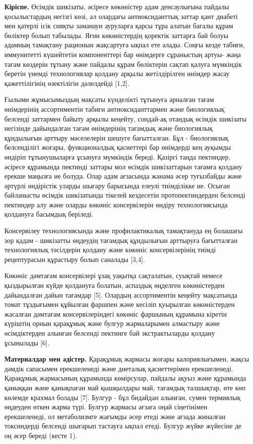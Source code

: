 \begin{multicols}{2}
{\bfseries Кіріспе.} Өсімдік шикізаты, әсіресе көкөністер адам денсаулығына
пайдалы қосылыстардың негізгі көзі, ал олардағы антиоксиданттық заттар
қант диабеті мен қатерлі ісік сияқты заманауи ауруларға қарсы тұра
алатын бағалы құрам бөліктер болып табылады. Яғни көкөністердің қоректік
заттарға бай болуы адамның тамақтану рационын жақсартуға ықпал ете
алады. Соңғы кезде табиғи, иммунитетті күшейтетін компоненттері бар
өнімдерге сұраныстың артуы- жаңа тағам көздерін тұтыну және пайдалы
құрам бөліктерін сақтап қалуға мүмкіндік беретін үнемді технологиялар
қолдану арқылы жетілдірілген өнімдер жасау қажеттілігінің өзектілігін
дәлелдейді {[}1,2{]}.

Ғылыми жұмысымыздың мақсаты күнделікті тұтынуға арналған тағам
өнімдерінің ассортиментін табиғи антиоксиданттармен және биологиялық
белсенді заттармен байыту арқылы кеңейту, сондай-ақ отандық өсімдік
шикізаты негізінде дайындалған тағам өнімдерінің тағамдық және
биологиялық құндылығын арттыру мәселелерін шешуге бағытталған. Бұл -
биологиялық белсенділігі жоғары, функционалдық қасиеттері бар өнімдерді
кең ауқымды өндіріп тұтынушыларға ұсынуға мүмкіндік береді. Қазіргі
таңда пектиндер, әсіресе құрамында пектинді заттары мол өсімдік
шикізаттарын тағамға қолдану ерекше маңызға ие болуда. Олар адам
ағзасында жанама әсер туғызбайды және әртүрлі өндірістік уларды шығару
барысында елеулі тиімділікке ие. Осыған байланысты өсімдік шикізатында
тікелей кездесетін протопектиндерден белсенді пектиндер алу және оларды
көкөніс консервілерін өндіру технологиясында қолдануға басымдық
беріледі.

Консервілеу технологиясында және профилактикалық тамақтануда ең болашағы
зор қадам - шикізатты өңдеудің тағамдық құндылығын арттыруға бағытталған
технологиялық тәсілдерін қолдану және көкөніс консервілерінің тиімді
рецептурасын құрастыру болып саналады {[}3,4{]}.

Көкөніс дәмтағам консервілері ұзақ уақытқа сақталатын, суықтай немесе
қыздырылған күйде қолдануға болатын, аспаздық өңделген көкөністерден
дайындалған дайын тағамдар {[}5{]}. Олардың ассортиментін кеңейту
мақсатында томат тұздығымен құйылған фаршпен және кесіліп қуырылған
көкөністерден жасалған дәмтағам консервілеріндегі көкөніс фаршының
құрамына кіретін күріштің орнын қарақұмық және булгур жармаларымен
алмастыру және өсімдіктерден алынған белсенді пектинге бай
экстрактыларды қолдану ұсынылады {[}6{]}.

{\bfseries Материалдар мен әдістер.} Қарақұмық жармасы жоғары
калориялығымен, жақсы дәмдік сапасымен ерекшеленеді және диеталық
қасиеттерімен ерекшеленеді. Қарақұмық жармасының құрамында көмірсулар,
пайдалы ақуыз және құрамында қаныққан және қанықпаған май қышқылдары
май, тағамдық талшықтар, өте көп көлемде крахмал болады {[}7{]}. Булгур
- бұл бидайдан алынған, сумен термиялық өңдеуден өткен жарма түрі.
Булгур жармасы ағзаға оңай сіңетінімен ерекшеленеді, ол метаболизмге
жағымды әсер етеді және ағзада жиналған токсиндерді белсенді шығарып
тастауға ықпал етеді. Булгур жүйке жүйесіне де оң әсер береді (кесте 1).
\end{multicols}


